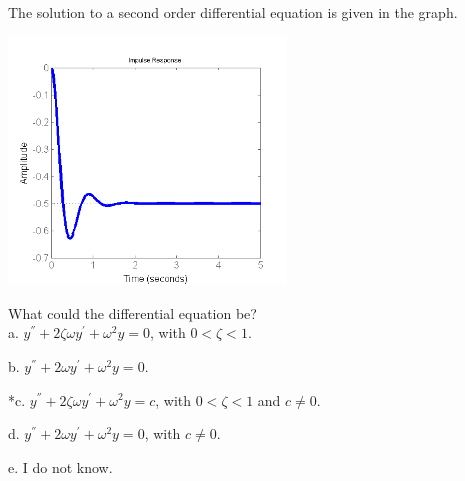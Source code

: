 
The solution to a second order differential equation is given in the graph.

\includegraphics[width=2.90392in,height=2.58948in]{../../Images/ODESolvingQ7.png}

What could the differential equation be? \\


a. \( y^{''} + 2\zeta\omega y^{'} + \omega^{2}y = 0 \), with \(0 < \zeta < 1\).

b. \( y^{''} + 2\omega y^{'} + \omega^{2}y = 0 \).

*c. \( y^{''} + 2\zeta\omega y^{'} + \omega^{2}y = c \), with \( 0 < \zeta < 1 \) and \( c \neq 0 \).

d. \( y^{''} + 2\omega y^{'} + \omega^{2}y = 0 \), with \( c \neq 0 \).

e. I do not know. \\
